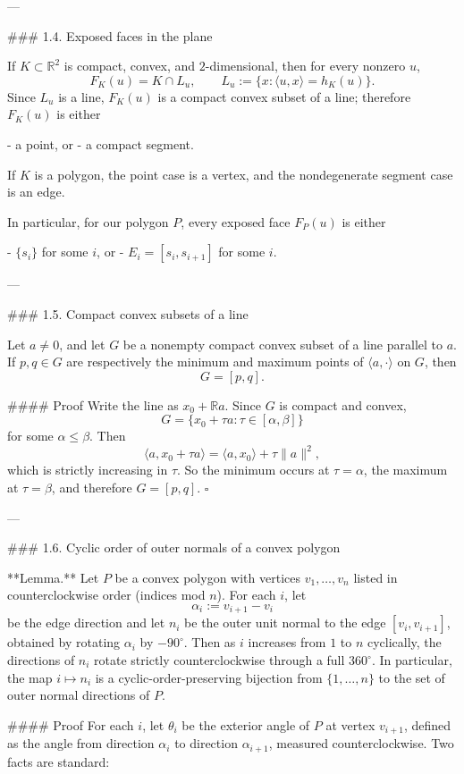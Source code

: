 ---

### 1.4. Exposed faces in the plane

If \(K\subset \mathbb R^2\) is compact, convex, and \(2\)-dimensional, then for every nonzero \(u\),
\[
F_K(u)=K\cap L_u,\qquad L_u:=\{x:\langle u,x\rangle=h_K(u)\}.
\]
Since \(L_u\) is a line, \(F_K(u)\) is a compact convex subset of a line; therefore \(F_K(u)\) is either

- a point, or
- a compact segment.

If \(K\) is a polygon, the point case is a vertex, and the nondegenerate segment case is an edge.

In particular, for our polygon \(P\), every exposed face \(F_P(u)\) is either

- \(\{s_i\}\) for some \(i\), or
- \(E_i=[s_i,s_{i+1}]\) for some \(i\).

---

### 1.5. Compact convex subsets of a line

Let \(a\neq 0\), and let \(G\) be a nonempty compact convex subset of a line parallel to \(a\). If \(p,q\in G\) are respectively the minimum and maximum points of \(\langle a,\cdot\rangle\) on \(G\), then
\[
G=[p,q].
\]

#### Proof
Write the line as \(x_0+\mathbb Ra\). Since \(G\) is compact and convex,
\[
G=\{x_0+\tau a:\tau\in[\alpha,\beta]\}
\]
for some \(\alpha\le \beta\). Then
\[
\langle a,x_0+\tau a\rangle=\langle a,x_0\rangle+\tau\|a\|^2,
\]
which is strictly increasing in \(\tau\). So the minimum occurs at \(\tau=\alpha\), the maximum at \(\tau=\beta\), and therefore \(G=[p,q]\).
\(\square\)

---

### 1.6. Cyclic order of outer normals of a convex polygon

**Lemma.** Let \(P\) be a convex polygon with vertices \(v_1,\dots,v_n\) listed in counterclockwise order (indices mod \(n\)). For each \(i\), let
\[
\alpha_i := v_{i+1}-v_i
\]
be the edge direction and let \(n_i\) be the outer unit normal to the edge \([v_i,v_{i+1}]\), obtained by rotating \(\alpha_i\) by \(-90^\circ\). Then as \(i\) increases from \(1\) to \(n\) cyclically, the directions of \(n_i\) rotate strictly counterclockwise through a full \(360^\circ\). In particular, the map \(i\mapsto n_i\) is a cyclic-order-preserving bijection from \(\{1,\dots,n\}\) to the set of outer normal directions of \(P\).

#### Proof
For each \(i\), let \(\theta_i\) be the exterior angle of \(P\) at vertex \(v_{i+1}\), defined as the angle from direction \(\alpha_i\) to direction \(\alpha_{i+1}\), measured counterclockwise. Two facts are standard:

